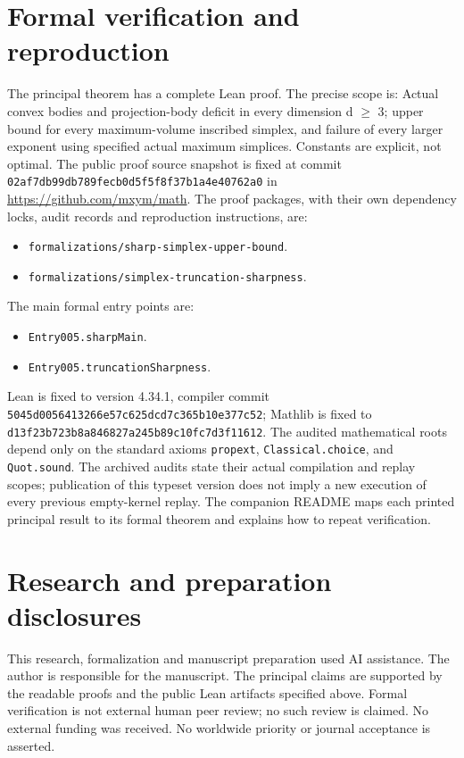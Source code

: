 \documentclass[11pt]{article}
\begin{document}
\section{Formal verification and reproduction}
The principal theorem has a complete Lean proof. The precise scope is:
Actual convex bodies and projection-body deficit in every dimension d $\ge$ 3; upper bound for every maximum-volume inscribed simplex, and failure of every larger exponent using specified actual maximum simplices. Constants are explicit, not optimal.
The public proof source snapshot is fixed at commit
\nolinkurl{02af7db99db789fecb0d5f5f8f37b1a4e40762a0} in \url{https://github.com/mxym/math}.
The proof packages, with their own dependency locks, audit records and
reproduction instructions, are:
\begin{itemize}
\item \nolinkurl{formalizations/sharp-simplex-upper-bound}.
\item \nolinkurl{formalizations/simplex-truncation-sharpness}.
\end{itemize}
The main formal entry points are:
\begin{itemize}
\item \nolinkurl{Entry005.sharpMain}.
\item \nolinkurl{Entry005.truncationSharpness}.
\end{itemize}
Lean is fixed to version 4.34.1, compiler commit
\nolinkurl{5045d0056413266e57c625dcd7c365b10e377c52}; Mathlib is fixed to
\nolinkurl{d13f23b723b8a846827a245b89c10fc7d3f11612}.
The audited mathematical roots depend only on the standard axioms
\texttt{propext}, \texttt{Classical.choice}, and \texttt{Quot.sound}.
The archived audits state their actual compilation and replay scopes;
publication of this typeset version does not imply a new execution of every
previous empty-kernel replay. The companion README maps each printed
principal result to its formal theorem and explains how to repeat verification.

\section*{Research and preparation disclosures}
This research, formalization and manuscript preparation used AI assistance.
The author is responsible for the manuscript. The principal claims are
supported by the readable proofs and the public Lean artifacts specified
above. Formal verification is not external human peer review; no such review
is claimed. No external funding was received. No worldwide priority or
journal acceptance is asserted.
\end{document}
